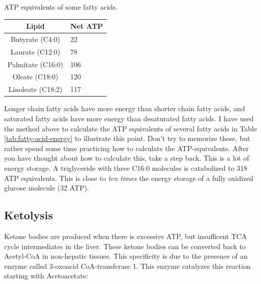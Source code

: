 \documentclass{tufte-handout}
\begin{document}
\begin{margintable}
\centering
\caption{ATP equivalents of some fatty acids.}
\label{tab:fatty-acid-energy}
\begin{tabular}{@{}cl@{}}
\toprule
\textbf{Lipid} & \textbf{Net ATP} \\ \midrule
Butyrate (C4:0)           &  22                \\
Laurate (C12:0)          & 78                    \\
Palmitate (C16:0)          & 106               \\
Oleate (C18:0)          & 120              \\
Linoleate (C18:2)          & 117            \\ \bottomrule
\end{tabular}
\end{margintable}

  Longer chain fatty acids have more energy than shorter chain fatty acids, and saturated fatty acids have more energy than desaturated fatty acids.  I have used the method above to calculate the ATP equivalents of several fatty acids in Table \ref{tab:fatty-acid-energy} to illustrate this point.  Don't try to memorize these, but rather spend some time practicing how to calculate the ATP-equivalents.  After you have thought about how to calculate this, take a step back.  This is a lot of energy storage.  A triglyceride with three C16:0 molecules is catabolized to 318 ATP equivalents.  This is close to \emph{ten times} the energy storage of a fully oxidized glucose molecule (32 ATP).

\subsection{Ketolysis}

Ketone bodies are produced when there is excessive ATP, but insufficent TCA cycle intermediates in the liver.  These ketone bodies can be converted back to Acetyl-CoA in non-hepatic tissues.  This specificity is due to the presence of an enzyme called 3-oxoacid CoA-transferase 1.  This enzyme catalyzes this reaction starting with Acetoacetate:
\end{document}
